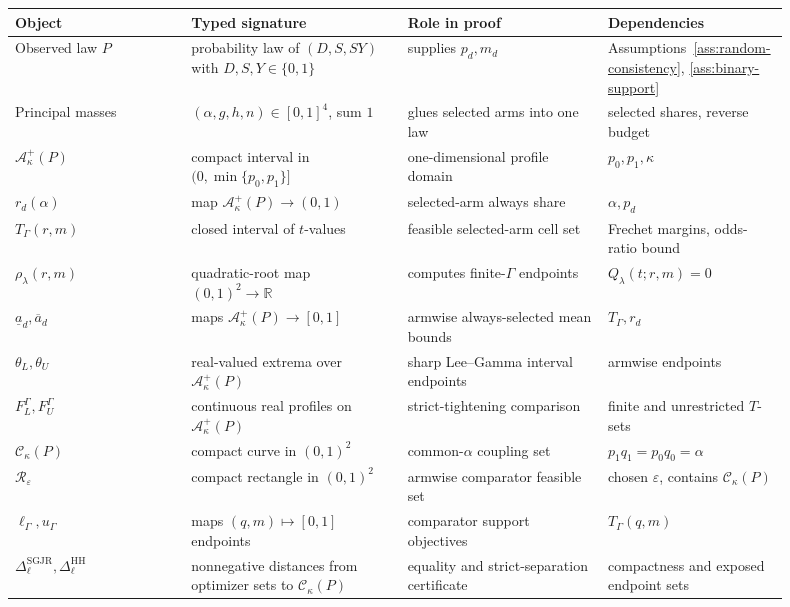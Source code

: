 \documentclass[11pt]{article}
\theoremstyle{definition}
\theoremstyle{plain}
\theoremstyle{remark}
\begin{document}
\begin{center}
\begin{tabular}{p{0.22\linewidth}p{0.27\linewidth}p{0.25\linewidth}p{0.16\linewidth}}
\hline
Object & Typed signature & Role in proof & Dependencies \\
\hline
Observed law \(P\) & probability law of \((D,S,SY)\) with \(D,S,Y\in\{0,1\}\) & supplies \(p_d,m_d\) & Assumptions~\ref{ass:random-consistency}, \ref{ass:binary-support} \\
Principal masses & \((\alpha,g,h,n)\in[0,1]^4\), sum \(1\) & glues selected arms into one law & selected shares, reverse budget \\
\(\mathcal A_\kappa^+(P)\) & compact interval in \((0,\min\{p_0,p_1\}]\) & one-dimensional profile domain & \(p_0,p_1,\kappa\) \\
\(r_d(\alpha)\) & map \(\mathcal A_\kappa^+(P)\to(0,1)\) & selected-arm always share & \(\alpha,p_d\) \\
\(T_\Gamma(r,m)\) & closed interval of \(t\)-values & feasible selected-arm cell set & Frechet margins, odds-ratio bound \\
\(\rho_\lambda(r,m)\) & quadratic-root map \((0,1)^2\to\mathbb R\) & computes finite-\(\Gamma\) endpoints & \(Q_\lambda(t;r,m)=0\) \\
\(\underline a_d,\overline a_d\) & maps \(\mathcal A_\kappa^+(P)\to[0,1]\) & armwise always-selected mean bounds & \(T_\Gamma,r_d\) \\
\(\theta_L,\theta_U\) & real-valued extrema over \(\mathcal A_\kappa^+(P)\) & sharp Lee--Gamma interval endpoints & armwise endpoints \\
\(F_L^\Gamma,F_U^\Gamma\) & continuous real profiles on \(\mathcal A_\kappa^+(P)\) & strict-tightening comparison & finite and unrestricted \(T\)-sets \\
\(\mathcal C_\kappa(P)\) & compact curve in \((0,1)^2\) & common-\(\alpha\) coupling set & \(p_1q_1=p_0q_0=\alpha\) \\
\(\mathcal R_\varepsilon\) & compact rectangle in \((0,1)^2\) & armwise comparator feasible set & chosen \(\varepsilon\), contains \(\mathcal C_\kappa(P)\) \\
\(\ell_\Gamma,u_\Gamma\) & maps \((q,m)\mapsto[0,1]\) endpoints & comparator support objectives & \(T_\Gamma(q,m)\) \\
\(\Delta_\ell^{\mathrm{SGJR}},\Delta_\ell^{\mathrm{HH}}\) & nonnegative distances from optimizer sets to \(\mathcal C_\kappa(P)\) & equality and strict-separation certificate & compactness and exposed endpoint sets \\
\hline
\end{tabular}
\end{center}
\end{document}
